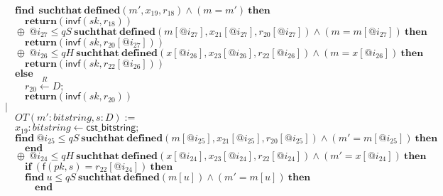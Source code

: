 \documentclass{article}
\newcommand{\store}{\leftarrow}
\newcommand{\getR}{\stackrel{R}{\store}}
\newcommand{\kw}[1]{\mathbf{#1}}
\newcommand{\kwf}[1]{\mathsf{#1}}
\newcommand{\var}[1]{\mathit{#1}}
\newcommand{\kwt}[1]{\mathit{#1}}
\newcommand{\kwp}[1]{\mathit{#1}}
\begin{document}
\begin{tabbing}
$\quad \quad \kw{find}\ \ \kw{suchthat}\ \kw{defined}(\var{m'}, \var{x}_{19}, \var{r}_{18})\wedge (\var{m}  =  \var{m'})\ \kw{then}$\\
$\quad \quad \quad \kw{return}\kwf{}(\kwf{invf}(\var{sk}, \var{r}_{18}))$\\
$\quad \quad \oplus\ \var{@i}_{27} \leq \kwp{qS}\ \kw{suchthat}\ \kw{defined}(\var{m}[\var{@i}_{27}], \var{x}_{21}[\var{@i}_{27}], \var{r}_{20}[\var{@i}_{27}])\wedge (\var{m}  =  \var{m}[\var{@i}_{27}])\ \kw{then}$\\
$\quad \quad \quad \kw{return}\kwf{}(\kwf{invf}(\var{sk}, \var{r}_{20}[\var{@i}_{27}]))$\\
$\quad \quad \oplus\ \var{@i}_{26} \leq \kwp{qH}\ \kw{suchthat}\ \kw{defined}(\var{x}[\var{@i}_{26}], \var{x}_{23}[\var{@i}_{26}], \var{r}_{22}[\var{@i}_{26}])\wedge (\var{m}  =  \var{x}[\var{@i}_{26}])\ \kw{then}$\\
$\quad \quad \quad \kw{return}\kwf{}(\kwf{invf}(\var{sk}, \var{r}_{22}[\var{@i}_{26}]))$\\
$\quad \quad \kw{else}$\\
$\quad \quad \quad \var{r}_{20} \getR \kwt{D};$\\
$\quad \quad \quad \kw{return}\kwf{}(\kwf{invf}(\var{sk}, \var{r}_{20}))$\\
$\quad |$\\
$\quad \quad OT(\var{m'}: \kwt{bitstring}, \var{s}: \kwt{D}) :=$\\
$\quad \quad \var{x}_{19}: \kwt{bitstring} \store \kwf{cst\_bitstring};$\\
$\quad \quad \kw{find}\ \var{@i}_{25} \leq \kwp{qS}\ \kw{suchthat}\ \kw{defined}(\var{m}[\var{@i}_{25}], \var{x}_{21}[\var{@i}_{25}], \var{r}_{20}[\var{@i}_{25}])\wedge (\var{m'}  =  \var{m}[\var{@i}_{25}])\ \kw{then}$\\
$\quad \quad \quad \kw{end}$\\
$\quad \quad \oplus\ \var{@i}_{24} \leq \kwp{qH}\ \kw{suchthat}\ \kw{defined}(\var{x}[\var{@i}_{24}], \var{x}_{23}[\var{@i}_{24}], \var{r}_{22}[\var{@i}_{24}])\wedge (\var{m'}  =  \var{x}[\var{@i}_{24}])\ \kw{then}$\\
$\quad \quad \quad \kw{if}\ (\kwf{f}(\var{pk}, \var{s})  =  \var{r}_{22}[\var{@i}_{24}])\ \kw{then}$\\
$\quad \quad \quad \kw{find}\ \var{u} \leq \kwp{qS}\ \kw{suchthat}\ \kw{defined}(\var{m}[\var{u}])\wedge (\var{m'}  =  \var{m}[\var{u}])\ \kw{then}$\\
$\quad \quad \quad \quad \kw{end}$\\

\end{tabbing}
\end{document}

